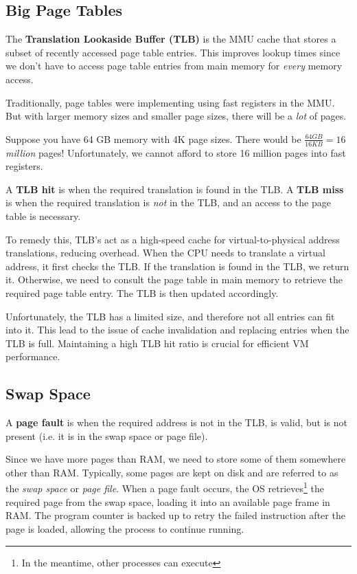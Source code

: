 \documentclass{report}
\newcommand{\definitionBegin}[1]{\begin{tcolorbox}[title={Definition: #1}]}
\newcommand{\definitionEnd}{\end{tcolorbox}}
\newcommand{\exampleBegin}[1]{\begin{tcolorbox}[colback=blue!5!white,colframe=black!75!blue,title={Example:
      #1}]}
\newcommand{\exampleEnd}{\end{tcolorbox}}
\begin{document}
\subsection{Big Page Tables}
\definitionBegin{Translation Lookaside Buffer}
The \textbf{Translation Lookaside Buffer (TLB)} is the MMU cache that stores a subset of recently
accessed page table entries. This improves lookup times since we don't have to access page table
entries from main memory for \textit{every} memory access.
\definitionEnd

Traditionally, page tables were implementing using fast registers in the MMU. But with larger memory
sizes and smaller page sizes, there will be a \textit{lot} of pages.

\exampleBegin{How Many Pages?}
Suppose you have 64 GB memory with 4K page sizes. There would be $\frac{64 \textit{GB}}{16
  \textit{KB}} = 16$ \textit{million} pages! Unfortunately, we cannot afford to store 16 million
pages into fast registers. 
\exampleEnd

\definitionBegin{TLB Hit and Miss}
A \textbf{TLB hit} is when the required translation is found in the TLB.
\tcblower
A \textbf{TLB miss} is when the required translation is \textit{not} in the TLB, and an access to
the page table is necessary.
\definitionEnd
To remedy this, TLB's act as a high-speed cache for virtual-to-physical address translations,
reducing overhead. When the CPU needs to translate a virtual address, it first checks the TLB. If
the translation is found in the TLB, we return it. Otherwise, we need to consult the page table in
main memory to retrieve the required page table entry. The TLB is then updated accordingly.

Unfortunately, the TLB has a limited size, and therefore not all entries can fit into it. This lead
to the issue of cache invalidation and replacing entries when the TLB is full. Maintaining a high
TLB hit ratio is crucial for efficient VM performance.


\subsection{Swap Space}
\definitionBegin{Page Fault}
A \textbf{page fault} is when the required address is not in the TLB, is valid, but is not present
(i.e. it is in the swap space or page file). 
\definitionEnd

Since we have more pages than RAM, we need to store some of them somewhere other than
RAM. Typically, some pages are kept on disk and are referred to as the \textit{swap space} or
\textit{page file}. When a page fault occurs, the OS retrieves\footnote{In the meantime, other
  processes can execute} the required page from the swap space, loading it into an available page
frame in RAM. The program counter is backed up to retry the failed instruction after the page is
loaded, allowing the process to continue running.  
\end{document}

